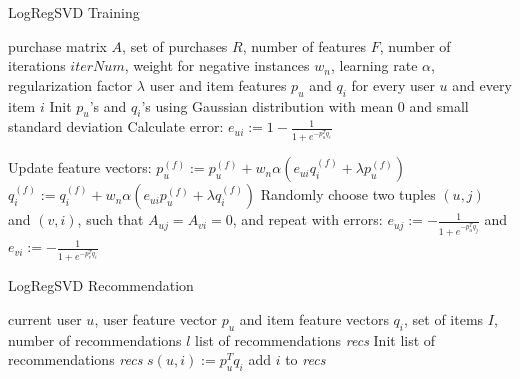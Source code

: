 \documentclass[10pt]{reportMaster}
\begin{document}
\begin{algorithm}
	\caption{LogRegSVD Training}
	\label{alg:LogRegSVDTraining}
	\begin{algorithmic}[1]
		\Require purchase matrix $A$, set of purchases $R$, number of features $F$, number of iterations $iterNum$, weight for negative instances $w_n$, learning rate $\alpha$, regularization factor $\lambda$
		\Ensure user and item features $p_u$ and $q_i$ for every user $u$ and every item $i$
		\State Init $p_u$'s and $q_i$'s using Gaussian distribution with mean $0$ and small standard deviation
				\State Calculate error:
				\State $e_{ui} := 1 - \frac{1}{1 + e^{-p_u^Tq_i}}$
				
				\State Update feature vectors:
					\State $p_u^{(f)} := p_u^{(f)} + w_n \alpha (e_{ui} q_i^{(f)} + \lambda p_u^{(f)})$
					\State $q_i^{(f)} := q_i^{(f)} + w_n \alpha (e_{ui} p_u^{(f)} + \lambda q_i^{(f)})$
				\EndFor	
				\State Randomly choose two tuples $(u,j)$ and $(v,i)$, such that $A_{uj} = A_{vi} = 0$, and repeat with errors: 
				\State $e_{uj} := - \frac{1}{1 + e^{-p_u^Tq_j}}$ and
				\State $e_{vi} := - \frac{1}{1 + e^{-p_v^Tq_i}}$
			\EndFor
		\EndFor
	\end{algorithmic}	
\end{algorithm}


\begin{algorithm}
	\caption{LogRegSVD Recommendation}
	\label{alg:LogRegSVDRecommendation}
	\begin{algorithmic}[1]
		\Require current user $u$, user feature vector $p_u$ and item feature vectors $q_i$, set of items $I$, number of recommendations $l$
		\Ensure list of recommendations \textit{recs}
		\State Init list of recommendations \textit{recs}
			\State $s(u,i) := p_u^Tq_i$
			\State add $i$ to \textit{recs}
			\EndIf
		\EndFor
	\end{algorithmic}	
\end{algorithm}
\end{document}
